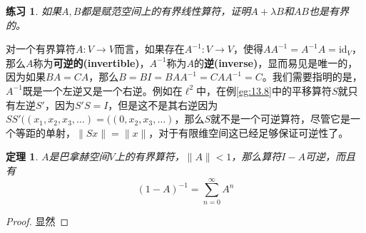 \documentclass[hyperref,UTF8]{ctexbook}
\newtheorem{theorem}{定理}[chapter]
\newtheorem*{exercise}{练习}
\begin{document}
\begin{exercise}
    如果\(A,B\)都是赋范空间上的有界线性算符，证明\(A+\lambda B\)和\(AB\)也是有界的。
\end{exercise}
对一个有界算符\(A:V\rightarrow V\)而言，如果存在\(A^{-1}:V\rightarrow V\)，使得\(A A^{-1}=A^{-1} A=\mathrm{id}_V\)，那么\(A\)称为\textbf{可逆的(invertible)}，\(A^{-1}\)称为\(A\)的\textbf{逆(inverse)}，显而易见是唯一的，因为如果\(BA=CA\)，那么$B=B I=B A A^{-1}=C A A^{-1}=C$。我们需要指明的是，\(A^{-1}\)既是一个左逆又是一个右逆。例如在\(\ell^2\)中，在例\ref{eg:13.8}中的平移算符\(S\)就只有左逆\(S'\)，因为\(S'S=I\)，但是这不是其右逆因为\(SS'(\left(x_{1}, x_{2}, x_{3}, \ldots\right)=(\left(0, x_{2}, x_{3}, \ldots\right)\)，那么\(S\)就不是一个可逆算符，尽管它是一个等距的单射，\(\|Sx\|=\|x\|\)，对于有限维空间这已经足够保证可逆性了。
\begin{theorem}\label{thm:13.12}
    \(A\)是巴拿赫空间\(V\)上的有界算符，\(\|A\|<1\)，那么算符\(I-A\)可逆，而且有
    \[(1-A)^{-1}=\sum_{n=0}^{\infty}A^n\]
\end{theorem}
\begin{proof}
    显然
\end{proof}
\end{document}
